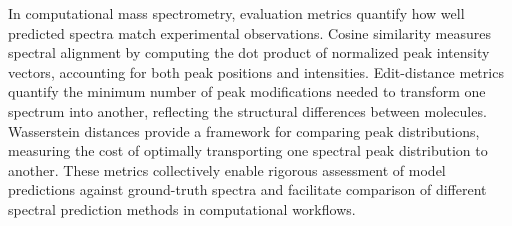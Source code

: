 In computational mass spectrometry, evaluation metrics quantify how well predicted spectra match experimental observations. 
Cosine similarity measures spectral alignment by computing the dot product of normalized peak intensity vectors, accounting for both peak positions and intensities. \cite[p.~4]{Wang2022}
Edit-distance metrics quantify the minimum number of peak modifications needed to transform one spectrum into another, reflecting the structural differences between molecules. \cite[pp.~1--2]{Maekinen2007}
Wasserstein distances provide a framework for comparing peak distributions, measuring the cost of optimally transporting one spectral peak distribution to another. \cite[pp.~1--8]{Ciach2020} \cite{Memoli2011}
These metrics collectively enable rigorous assessment of model predictions against ground-truth spectra and facilitate comparison of different spectral prediction methods in computational workflows.
